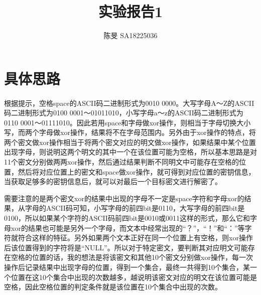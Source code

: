 \documentclass[UTF8]{article}
\title{实验报告1}
\author{陈旻 SA18225036}
\date{}
\begin{document}
\maketitle
\section{具体思路}
\paragraph{}
根据提示，空格space的ASCII码二进制形式为0010 0000。大写字母A～Z的ASCII码二进制形式为0100 0001～01011010，小写字母a～z的ASCII码二进制形式为 0110 0001～01111010。因此若用space和字母做xor操作，则相当于字母切换大小写，而两个字母做xor操作，结果将不在字母范围内。另外由于xor操作的特点，将两个密文做xor操作相当于将两个密文对应的明文做xor操作，如果结果中某个位置出现字母，则说明这两个明文的其中一个在该位置可能为空格，所以基本思路是对11个密文分别做两两xor操作，然后通过结果判断不同明文中可能存在空格的位置，然后将对应位置上的密文和space做xor操作，就可得到对应位置的密钥信息，当获取足够多的密钥信息后，就可以对最后一个目标密文进行解密了。

需要注意的是两个密文xor的结果中出现的字母不一定是space字符和字母xor的结果，从字母的ASCII码可知，小写字母的前四bit是0110，大写字母的前四bit是0100，所以如果某个字符的ASCII码前四bit是0010或0011这样的形式，那么它和字母xor的结果也可能是另外一个字母，而文本中经常出现的“？”，“！”和“：”等字符就符合这样的特征。另外如果两个文本正好在同一个位置上有空格，则xor操作后该位置得到的字符将是“NULL”。所以对于特定密文，要判断其对应明文可能存在空格的位置的话，我的想法是将该密文和其他10个密文分别做xor操作，每一次操作后记录结果中出现字母的位置，得到一个集合，最终一共得到10个集合，某一个位置在这10个集合中出现的次数越多，越说明该密文对应的明文在该位置可能是空格，因此空格位置的判定条件就是该位置在10个集合中出现的次数。
\end{document}
